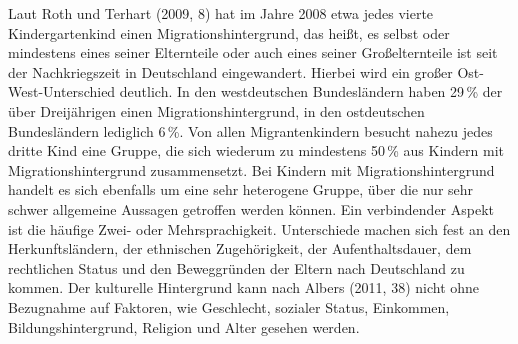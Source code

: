 Laut Roth und Terhart (2009, 8) hat im Jahre 2008 etwa jedes vierte Kindergartenkind einen Migrationshintergrund, das heißt, es selbst oder mindestens eines seiner Elternteile oder auch eines seiner Großelternteile ist seit der Nachkriegszeit in Deutschland eingewandert. Hierbei wird ein großer Ost-West-Unterschied deutlich. In den westdeutschen Bundesländern haben 29\,\% der über Dreijährigen einen Migrationshintergrund, in den ostdeutschen Bundesländern lediglich 6\,\%. Von allen Migrantenkindern besucht nahezu jedes dritte Kind eine Gruppe, die sich wiederum zu mindestens 50\,\% aus Kindern mit Migrationshintergrund zusammensetzt. Bei Kindern mit Migrationshintergrund handelt es sich ebenfalls um eine sehr heterogene Gruppe, über die nur sehr schwer allgemeine Aussagen getroffen werden können. Ein verbindender Aspekt ist die häufige Zwei- oder Mehrsprachigkeit. Unterschiede machen sich fest an den Herkunftsländern, der ethnischen Zugehörigkeit, der Aufenthaltsdauer, dem rechtlichen Status und den Beweggründen der Eltern nach Deutschland zu kommen. Der kulturelle Hintergrund kann nach Albers (2011, 38) nicht ohne Bezugnahme auf Faktoren, wie Geschlecht, sozialer Status, Einkommen, Bildungshintergrund, Religion und Alter gesehen werden.
 
